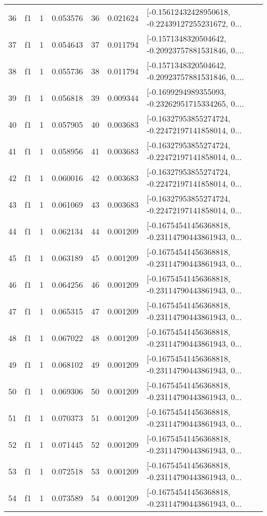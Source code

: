 \begin{tabular}{lllrlrl}
36  &  f1 &   1 &  0.053576 &   36 &  0.021624 &  [-0.15612432428950618, -0.22439127255231672, 0... \\
37  &  f1 &   1 &  0.054643 &   37 &  0.011794 &  [-0.1571348320504642, -0.20923757881531846, 0.... \\
38  &  f1 &   1 &  0.055736 &   38 &  0.011794 &  [-0.1571348320504642, -0.20923757881531846, 0.... \\
39  &  f1 &   1 &  0.056818 &   39 &  0.009344 &  [-0.1699294989355093, -0.23262951715334265, 0.... \\
40  &  f1 &   1 &  0.057905 &   40 &  0.003683 &  [-0.16327953855274724, -0.22472197141858014, 0... \\
41  &  f1 &   1 &  0.058956 &   41 &  0.003683 &  [-0.16327953855274724, -0.22472197141858014, 0... \\
42  &  f1 &   1 &  0.060016 &   42 &  0.003683 &  [-0.16327953855274724, -0.22472197141858014, 0... \\
43  &  f1 &   1 &  0.061069 &   43 &  0.003683 &  [-0.16327953855274724, -0.22472197141858014, 0... \\
44  &  f1 &   1 &  0.062134 &   44 &  0.001209 &  [-0.16754541456368818, -0.23114790443861943, 0... \\
45  &  f1 &   1 &  0.063189 &   45 &  0.001209 &  [-0.16754541456368818, -0.23114790443861943, 0... \\
46  &  f1 &   1 &  0.064256 &   46 &  0.001209 &  [-0.16754541456368818, -0.23114790443861943, 0... \\
47  &  f1 &   1 &  0.065315 &   47 &  0.001209 &  [-0.16754541456368818, -0.23114790443861943, 0... \\
48  &  f1 &   1 &  0.067022 &   48 &  0.001209 &  [-0.16754541456368818, -0.23114790443861943, 0... \\
49  &  f1 &   1 &  0.068102 &   49 &  0.001209 &  [-0.16754541456368818, -0.23114790443861943, 0... \\
50  &  f1 &   1 &  0.069306 &   50 &  0.001209 &  [-0.16754541456368818, -0.23114790443861943, 0... \\
51  &  f1 &   1 &  0.070373 &   51 &  0.001209 &  [-0.16754541456368818, -0.23114790443861943, 0... \\
52  &  f1 &   1 &  0.071445 &   52 &  0.001209 &  [-0.16754541456368818, -0.23114790443861943, 0... \\
53  &  f1 &   1 &  0.072518 &   53 &  0.001209 &  [-0.16754541456368818, -0.23114790443861943, 0... \\
54  &  f1 &   1 &  0.073589 &   54 &  0.001209 &  [-0.16754541456368818, -0.23114790443861943, 0... \\

\end{tabular}
